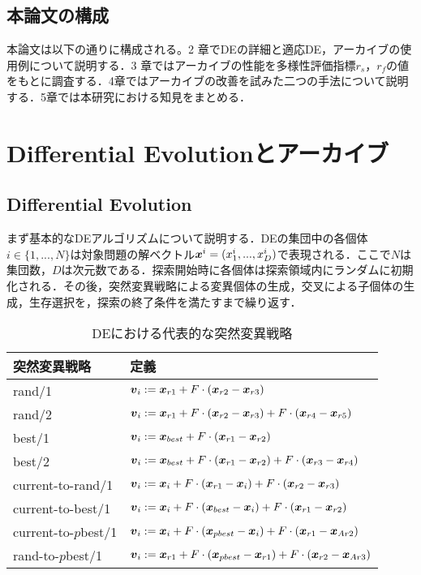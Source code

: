 \documentclass[a4paper,11pt,oneside,openany]{jsbook}
\def\vector#1{\mbox{\boldmath $#1$}}
\begin{document}
\section{本論文の構成}
本論文は以下の通りに構成される。2 章でDEの詳細と適応DE，アーカイブの使用例について説明する．3 章ではアーカイブの性能を多様性評価指標$r_s$，$r_f$の値をもとに調査する．4章ではアーカイブの改善を試みた二つの手法について説明する．5章では本研究における知見をまとめる．

\chapter{Differential Evolutionとアーカイブ}
\section{Differential Evolution}
まず基本的なDEアルゴリズムについて説明する．DEの集団中の各個体$i \in \{1, ..., N\}$は対象問題の解ベクトル$\vector{x}^i = (x^i_1, ..., x^i_D)$で表現される．ここで$N$は集団数，$D$は次元数である．探索開始時に各個体は探索領域内にランダムに初期化される．その後，突然変異戦略による変異個体の生成，交叉による子個体の生成，生存選択を，探索の終了条件を満たすまで繰り返す．

\begin{table}[h]
  \begin{center}
  \caption{DEにおける代表的な突然変異戦略}
    \begin{tabular}{ll} \hline
      突然変異戦略　& 定義  \\ \hline
      rand/1 & $\vector{v}_{i} := \vector{x}_{r1} + F\cdot(\vector{x}_{r2} - \vector{x}_{r3})$ \\
      rand/2 & $\vector{v}_{i} := \vector{x}_{r1} + F\cdot(\vector{x}_{r2} - \vector{x}_{r3}) + F\cdot(\vector{x}_{r4} - \vector{x}_{r5})$ \\
      best/1 & $\vector{v}_{i} := \vector{x}_{best} + F\cdot(\vector{x}_{r1} - \vector{x}_{r2})$ \\
      best/2 & $\vector{v}_{i} := \vector{x}_{best} + F\cdot(\vector{x}_{r1} - \vector{x}_{r2}) + F\cdot(\vector{x}_{r3} - \vector{x}_{r4})$ \\
      current-to-rand/1 & $\vector{v}_{i} := \vector{x}_{i} + F\cdot(\vector{x}_{r1} - \vector{x}_{i}) + F\cdot(\vector{x}_{r2} - \vector{x}_{r3})$ \\
      current-to-best/1 & $\vector{v}_{i} := \vector{x}_{i} + F\cdot(\vector{x}_{best} - \vector{x}_{i}) + F\cdot(\vector{x}_{r1} - \vector{x}_{r2})$ \\
      current-to-$p$best/1 & $\vector{v}_{i} := \vector{x}_{i} + F\cdot(\vector{x}_{pbest} - \vector{x}_{i}) + F\cdot(\vector{x}_{r1} - \vector{x}_{Ar2})$ \\
      rand-to-$p$best/1 & $\vector{v}_{i} := \vector{x}_{r1} + F\cdot(\vector{x}_{pbest} - \vector{x}_{r1}) + F\cdot(\vector{x}_{r2} - \vector{x}_{Ar3})$ \\ \hline
    \end{tabular}
  \end{center}
\end{table}
\end{document}
